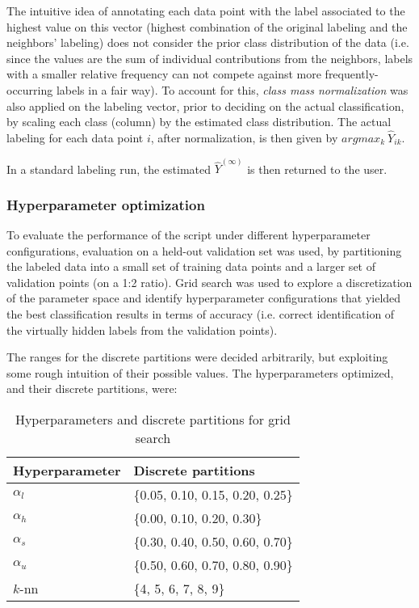 \documentclass[oneside, a4paper, draft]{memoir} %
\begin{document}
The intuitive idea of annotating each data point with the label associated to the highest
value on this vector (highest combination of the original labeling and the neighbors' labeling) does not consider
the prior class distribution of the data (i.e. since the values are the sum of individual contributions from 
the neighbors, labels with a smaller relative frequency can not compete against more frequently-occurring labels
in a fair way). To account for this, \emph{class mass normalization} was also applied on the labeling vector, prior
to deciding on the actual classification, by scaling each class (column) by the estimated class distribution.
The actual labeling for each data point $i$, after normalization, is then given by $argmax_k\ \hat{Y}_{ik}$.

In a standard labeling run, the estimated $\hat{Y}^{(\infty)}$ is then returned to the user.

\subsubsection{Hyperparameter optimization}
To evaluate the performance of the script under different hyperparameter configurations, evaluation on a held-out
validation set was used, by partitioning the labeled data into a small set of training data points and a larger set
of validation points (on a 1:2 ratio). Grid search was used to explore a discretization of the parameter space and
identify hyperparameter configurations that yielded the best classification results in terms of accuracy (i.e. correct 
identification of the virtually hidden labels from the validation points).

The ranges for the discrete partitions were decided  arbitrarily, but
exploiting some rough intuition of their possible values. The hyperparameters optimized, and their discrete
partitions, were:
\begin{table}[here]
	\label{tbl:hyper}
	\centering
	\begin{tabular}{ll}
		\hline
		Hyperparameter & Discrete partitions\\
		\hline
		$\alpha_l$ & \{0.05, 0.10, 0.15, 0.20, 0.25\}\\
		$\alpha_h$ & \{0.00, 0.10, 0.20, 0.30\}\\
		$\alpha_s$ & \{0.30, 0.40, 0.50, 0.60, 0.70\}\\
		$\alpha_u$ & \{0.50, 0.60, 0.70, 0.80, 0.90\}\\
		$k$-nn & \{4, 5, 6, 7, 8, 9\}\\
		\hline
	\end{tabular}
	\caption{Hyperparameters and discrete partitions for grid search}
\end{table}
\end{document}
